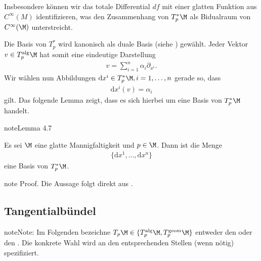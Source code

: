 \documentclass[letterpaper,10pt,english]{jupyterBook}
\begin{document}
\sphinxAtStartPar
Insbesondere können wir das totale Differential \(df\) mit einer glatten Funktion aus \(C^\infty(M)\) identifizieren, was den Zusammenhang von \(T^\ast_p \M\) als Bidualraum von \(C^\infty(\M)\) unterstreicht.

\sphinxAtStartPar
Die Basis von \(T^\ast_p\) wird kanonisch als duale Basis (siehe {\hyperref[\detokenize{vektoranalysis/multilinear:lem:dualeBasis}]{}}) gewählt.
Jeder Vektor \(v\in T_p^{\text{alg}}\M\) hat somit eine eindeutige Darstellung
\begin{equation*}
\begin{split}v = \sum_{i=1}^n \alpha_i \partial_{x^i}.\end{split}
\end{equation*}
\sphinxAtStartPar
Wir wählen nun Abbildungen \(\mathrm{d}x^i\in T^\ast_p\M, i=1,\ldots,n\) gerade so, dass
\begin{equation*}
\begin{split}\mathrm{d}x^i(v) = \alpha_i\end{split}
\end{equation*}
\sphinxAtStartPar
gilt.
Das folgende Lemma zeigt, dass es sich hierbei um eine Basis von \(T^\ast_p\M\) handelt.
\label{manifolds/tangential:lemma-18}
\begin{sphinxadmonition}{note}{Lemma 4.7}



\sphinxAtStartPar
Es sei \(\M\) eine glatte Mannigfaltigkeit und \(p\in\M\).
Dann ist die Menge
\begin{equation*}
\begin{split}\{\mathrm{d}x^1,\ldots, \mathrm{d}x^n\}\end{split}
\end{equation*}
\sphinxAtStartPar
eine Basis von \(T_p^\ast\M\).
\end{sphinxadmonition}

\begin{sphinxadmonition}{note}
\sphinxAtStartPar
Proof. Die Aussage folgt direkt aus {\hyperref[\detokenize{vektoranalysis/multilinear:lem:dualeBasis}]{}}.
\end{sphinxadmonition}


\subsection{Tangentialbündel}
\label{\detokenize{manifolds/tangential:tangentialbundel}}
\begin{sphinxadmonition}{note}{Note:}
\sphinxAtStartPar
Im Folgenden bezeichne \(T_p\M\in\{T^{\text{alg}}_p\M, T^{\text{geom}}_p\M \}\) entweder den  oder den .
Die konkrete Wahl wird an den entsprechenden Stellen (wenn nötig) spezifiziert.
\end{sphinxadmonition}
\end{document}
